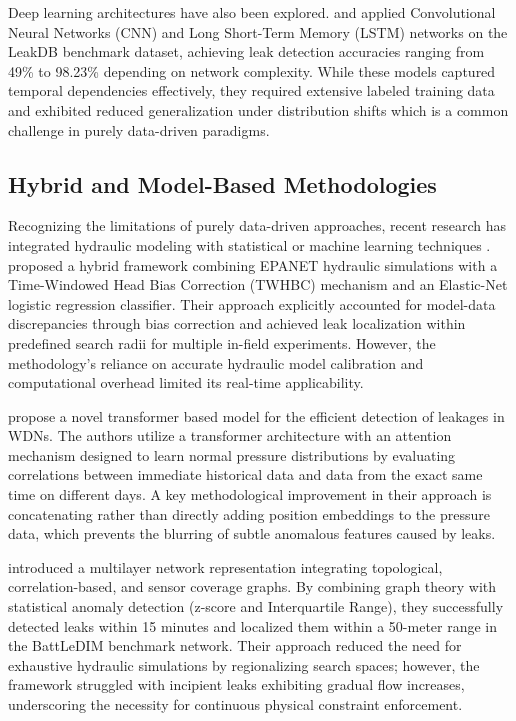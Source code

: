 \documentclass[final,5p,times,twocolumn,authoryear]{elsarticle}
\begin{document}
Deep learning architectures have also been explored. \cite{punukollu2023leakdetection} and \cite{w12123399} applied Convolutional Neural Networks (CNN) and Long Short-Term Memory (LSTM) networks on the LeakDB benchmark dataset, achieving leak detection accuracies ranging from 49\% to 98.23\% depending on network complexity. While these models captured temporal dependencies effectively, they required extensive labeled training data and exhibited reduced generalization under distribution shifts which is a common challenge in purely data-driven paradigms.

\subsection{Hybrid and Model-Based Methodologies}

Recognizing the limitations of purely data-driven approaches, recent research has integrated hydraulic modeling with statistical or machine learning techniques \cite{Hu2021LeakReview}. \cite{mazaev2022probabilisticleaklocalization} proposed a hybrid framework combining EPANET hydraulic simulations with a Time-Windowed Head Bias Correction (TWHBC) mechanism and an Elastic-Net logistic regression classifier. Their approach explicitly accounted for model-data discrepancies through bias correction and achieved leak localization within predefined search radii for multiple in-field experiments. However, the methodology's reliance on accurate hydraulic model calibration and computational overhead limited its real-time applicability.

\cite{s24196294} propose a novel transformer based model for the efficient detection of leakages in WDNs. The authors utilize a transformer architecture with an attention mechanism designed to learn normal pressure distributions by evaluating correlations between immediate historical data and data from the exact same time on different days. A key methodological improvement in their approach is concatenating rather than directly adding position embeddings to the pressure data, which prevents the blurring of subtle anomalous features caused by leaks.

\cite{barros_leak_2025} introduced a multilayer network representation integrating topological, correlation-based, and sensor coverage graphs. By combining graph theory with statistical anomaly detection (z-score and Interquartile Range), they successfully detected leaks within 15 minutes and localized them within a 50-meter range in the BattLeDIM benchmark network. Their approach reduced the need for exhaustive hydraulic simulations by regionalizing search spaces; however, the framework struggled with incipient leaks exhibiting gradual flow increases, underscoring the necessity for continuous physical constraint enforcement.
\end{document}
